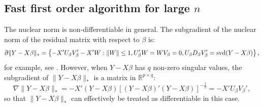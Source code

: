 \documentclass[12pt]{article}
\begin{document}
\subsection{Fast first order algorithm for large $n$}
The nuclear norm is non-differentiable in general. The subgradient of the nuclear norm of the residual matrix with respect to $\beta$ is: 
$$ \partial \|Y - X\beta\|_* = \left\{- X'U_\beta V_\beta' - X'W:  \|W\| \leq 1, U_\beta'W = WV_\beta = 0, U_\beta D_\beta V_\beta' = {\rm svd}(Y - X \beta) \right\},$$
for example, see \citet{watson1992characterization}.
However, when $Y - X\beta$ has $q$ non-zero singular values, the subgradient of $\|Y - X\beta\|_*$ is a matrix in $\mathbb{R}^{p \times q}:$
\begin{equation}\label{eq:gradient_NN}
\nabla \|Y - X\beta\|_* = - X'(Y - X\beta)\left[(Y - X\beta)'(Y - X\beta)\right]^{-\frac{1}{2}}
 = -X'U_\beta V_\beta',
 \end{equation}
so that $\|Y - X\beta\|_*$ can effectively be treated as differentiable in this case. 
\end{document}
